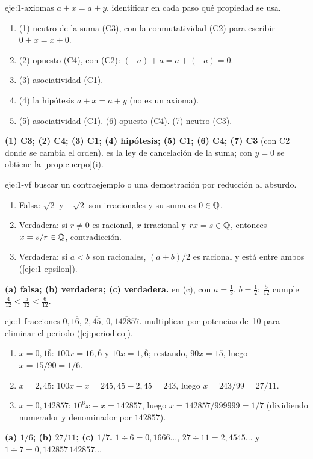 \begin{solucion}{eje:1-axiomas}
\datos $a+x=a+y$.
\planteamiento identificar en cada paso qué propiedad se usa.
\pasos
\begin{enumerate}[label=\arabic*.]
  \item (1) neutro de la suma (C3), con la conmutatividad (C2) para escribir $0+x=x+0$.
  \item (2) opuesto (C4), con (C2): $(-a)+a=a+(-a)=0$.
  \item (3) asociatividad (C1).
  \item (4) la hipótesis $a+x=a+y$ (no es un axioma).
  \item (5) asociatividad (C1). (6) opuesto (C4). (7) neutro (C3).
\end{enumerate}
\resultado \textbf{(1) C3; (2) C4; (3) C1; (4) hipótesis; (5) C1; (6) C4; (7) C3} (con C2 donde se cambia el orden).
\comprobacion es la ley de cancelación de la suma; con $y=0$ se obtiene la \cref{prop:cuerpo}(i).
\end{solucion}

\begin{solucion}{eje:1-vf}
\planteamiento buscar un contraejemplo o una demostración por reducción al absurdo.
\pasos
\begin{enumerate}[label=(\alph*)]
  \item Falsa: $\sqrt2$ y $-\sqrt2$ son irracionales y su suma es $0\in\mathbb{Q}$.
  \item Verdadera: si $r\neq0$ es racional, $x$ irracional y $rx=s\in\mathbb{Q}$, entonces $x=s/r\in\mathbb{Q}$, contradicción.
  \item Verdadera: si $a<b$ son racionales, $(a+b)/2$ es racional y está entre ambos (\cref{eje:1-epsilon}).
\end{enumerate}
\resultado \textbf{(a) falsa; (b) verdadera; (c) verdadera.}
\comprobacion en (c), con $a=\frac13$, $b=\frac12$: $\frac{5}{12}$ cumple $\frac4{12}<\frac5{12}<\frac6{12}$.
\end{solucion}

\begin{solucion}{eje:1-fracciones}
\datos $0{,}1\overline6$, $2{,}\overline{45}$, $0{,}\overline{142857}$.
\planteamiento multiplicar por potencias de~10 para eliminar el periodo (\cref{ej:periodico}).
\pasos
\begin{enumerate}[label=(\alph*)]
  \item $x=0{,}1\overline6$: $100x=16{,}\overline6$ y $10x=1{,}\overline6$; restando, $90x=15$, luego $x=15/90=1/6$.
  \item $x=2{,}\overline{45}$: $100x-x=245{,}\overline{45}-2{,}\overline{45}=243$, luego $x=243/99=27/11$.
  \item $x=0{,}\overline{142857}$: $10^6x-x=142857$, luego $x=142857/999999=1/7$ (dividiendo numerador y denominador por $142857$).
\end{enumerate}
\resultado \textbf{(a) $1/6$; (b) $27/11$; (c) $1/7$.}
\comprobacion $1\div6=0{,}1666\ldots$, $27\div11=2{,}4545\ldots$ y $1\div7=0{,}142857\,142857\ldots$
\end{solucion}


